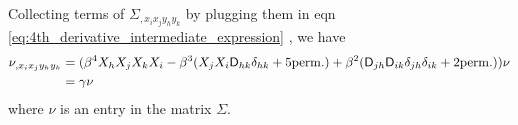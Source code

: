 Collecting terms of $\Sigma_{,x_i x_j y_h y_k}$ by plugging them in eqn
\ref{eq:4th_derivative_intermediate_expression}
, we have 
\begin{align}
\nu_{,x_i x_j y_h y_k} &= (\beta^4 X_h X_j X_k X_i -  
\beta^3 (X_j X_i \mathsf{D}_{hk} \delta_{hk} + 5 {\rm perm.}) + \beta^2
(\mathsf{D}_{jh} \mathsf{D}_{ik}\delta_{jh}\delta_{ik} + 2 {\rm perm.})) \nu \\
&= \gamma \nu
\end{align}
where $\nu$ is an entry in the matrix $\Sigma$.

